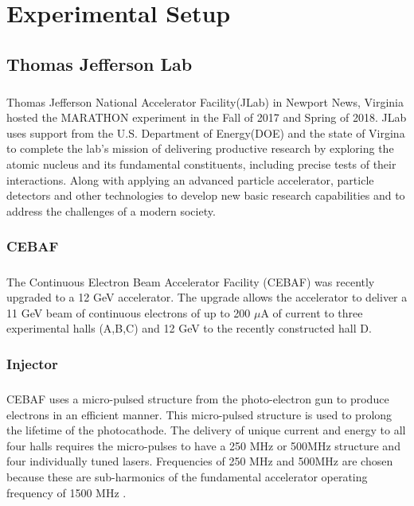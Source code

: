 


\chapter{ Experimental Setup} \label{ch:ExpUp}

\section{Thomas Jefferson Lab}
\paragraph{}Thomas Jefferson National Accelerator Facility(JLab) in Newport News, Virginia hosted the MARATHON experiment in the Fall of 2017 and Spring of 2018. JLab uses support from the U.S. Department of Energy(DOE) and the state of Virgina to complete the lab's mission of delivering productive research by exploring the atomic nucleus and its fundamental constituents, including precise tests of their interactions. Along with applying an advanced particle accelerator, particle detectors and other technologies to develop new basic research capabilities and to address the challenges of a modern society.
\subsection{CEBAF}\label{sec:cebaf}
	\paragraph{}The Continuous Electron Beam Accelerator Facility (CEBAF) was recently upgraded to a 12 GeV accelerator. The upgrade allows the accelerator to deliver a 11 GeV beam of continuous electrons of up to 200 $\mu$A of current to three experimental halls (A,B,C) and 12 GeV to the recently constructed hall D. 
\subsection{Injector}
	\paragraph{} CEBAF uses a micro-pulsed structure from the photo-electron gun to produce electrons in an efficient manner. This micro-pulsed structure is used to prolong the lifetime of the photocathode. The delivery of unique current and energy to all four halls requires the micro-pulses to have a 250 MHz or 500MHz structure and four individually tuned lasers. Frequencies of 250 MHz and 500MHz are chosen because these are sub-harmonics of the fundamental accelerator operating frequency of 1500 MHz \cite{CEBAF}. 

